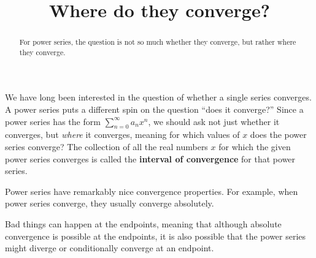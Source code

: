 \documentclass{ximera}
\title{Where do they converge?}
\begin{document}
\begin{abstract}
  For power series, the question is not so much whether they converge, but rather where they converge.
\end{abstract}

\maketitle

We have long been interested in the question of whether a single series converges.  A power series puts a different spin on the question ``does it converge?''  Since a power series has the form \(\sum_{n=0}^\infty a_n x^n\), we should ask not just whether it converges, but \textit{where} it converges, meaning for which values of \(x\) does the power series converge?  The collection of all the real numbers \(x\) for which the given power series converges is called the
\textbf{interval of convergence} for that power series.


Power series have remarkably nice convergence properties.  For
example, when power series converge, they usually converge absolutely.


Bad things can happen at the endpoints, meaning that although absolute convergence is possible at the endpoints, it is also possible that the power series might diverge or conditionally converge at an endpoint.

\end{document}

